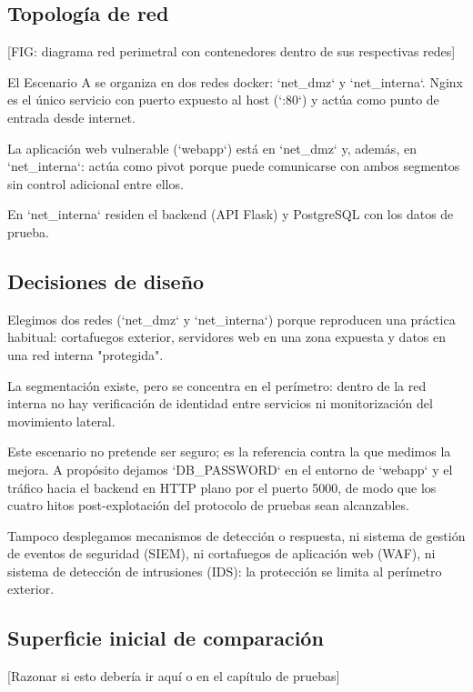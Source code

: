 \documentclass[11pt,spanish,listoffigures,listoftables]{tfgetsinf}
\begin{document}
        \subsection{Topología de red}
        [FIG: diagrama red perimetral con contenedores dentro de sus respectivas redes]
        
        El Escenario A se organiza en dos redes docker: `net\_dmz` y `net\_interna`. Nginx es el único servicio con puerto expuesto al host (`:80`) y actúa como punto de entrada desde internet.
        
        La aplicación web vulnerable (`webapp`) está en `net\_dmz` y, además, en `net\_interna`: actúa como pivot porque puede comunicarse con ambos segmentos sin control adicional entre ellos. 
        
        En `net\_interna` residen el backend (API Flask) y PostgreSQL con los datos de prueba.
        
        \subsection{Decisiones de diseño}
        Elegimos dos redes (`net\_dmz` y `net\_interna`) porque reproducen una práctica habitual: cortafuegos exterior, servidores web en una zona expuesta y datos en una red interna "protegida".
        
        La segmentación existe, pero se concentra en el perímetro: dentro de la red interna no hay verificación de identidad entre servicios ni monitorización del movimiento lateral.
        
        Este escenario no pretende ser seguro; es la referencia contra la que medimos la mejora. A propósito dejamos `DB\_PASSWORD` en el entorno de `webapp` y el tráfico hacia el backend en HTTP plano por el puerto 5000, de modo que los cuatro hitos post-explotación del protocolo de pruebas sean alcanzables. 
        
        Tampoco desplegamos mecanismos de detección o respuesta, ni sistema de gestión de eventos de seguridad (SIEM), ni cortafuegos de aplicación web (WAF), ni sistema de detección de intrusiones (IDS): la protección se limita al perímetro exterior.
        
        \subsection{Superficie inicial de comparación}
        \label{sec:4.2.3}

        [Razonar si esto debería ir aquí o en el capítulo de pruebas]
\end{document}

